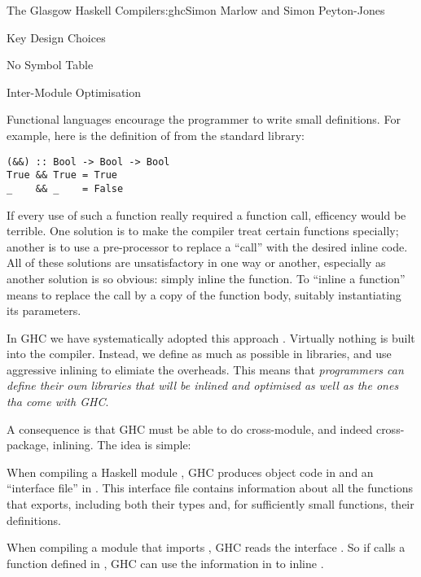 \begin{aosachapter}{The Glasgow Haskell Compiler}{s:ghc}{Simon Marlow and Simon Peyton-Jones}
\begin{aosasect1}{Key Design Choices}
\begin{aosasect2}{No Symbol Table}
\end{aosasect2}

\begin{aosasect2}{Inter-Module Optimisation}

Functional languages encourage the programmer to write small
definitions.  For example, here is the definition of \code{&&} from
the standard library:

\begin{verbatim}
(&&) :: Bool -> Bool -> Bool
True && True = True
_    && _    = False
\end{verbatim}

If every use of such a function really required a function call,
efficency would be terrible.  One solution is to make the compiler
treat certain functions specially; another is to use a pre-processor
to replace a ``call'' with the desired inline code.  All of these
solutions are unsatisfactory in one way or another, especially as
another solution is so obvious: simply inline the function.  To
``inline a function'' means to replace the call by a copy of the
function body, suitably instantiating its parameters.

In GHC we have systematically adopted this approach \cite{bib:inlining}.
Virtually nothing is built into the compiler.  Instead, we define as
much as possible in libraries, and use aggressive inlining to elimiate
the overheads.  This means that \emph{programmers can define their own
  libraries that will be inlined and optimised as well as the ones tha
  come with GHC}.

A consequence is that GHC must be able to do cross-module, and indeed
cross-package, inlining.  The idea is simple:

\begin{aosaitemize}

\item When compiling a Haskell module , GHC produces
  object code in  and an ``interface file'' in
  .  This interface file contains information about all
  the functions that  exports, including both their types
  and, for sufficiently small functions, their definitions.

\item When compiling a module  that imports
  , GHC reads the interface .  So if
   calls a function  defined in ,
  GHC can use the information in  to inline .


\end{aosaitemize}
\end{aosasect2}
\end{aosasect1}
\end{aosachapter}
